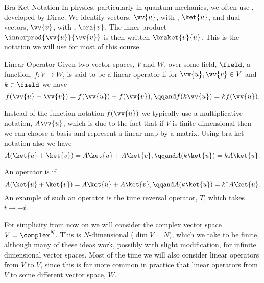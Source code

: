 \begin{ntn}{Bra-Ket Notation}{}
    In physics, particularly in quantum mechanics, we often use , developed by Dirac.
    We identify vectors, \(\vv{u}\), with , \(\ket{u}\), and dual vectors, \(\vv{v}\), with , \(\bra{v}\).
    The inner product \(\innerprod{\vv{u}}{\vv{v}}\) is then written \(\braket{v}{u}\).
    This is the notation we will use for most of this course.
\end{ntn}

\begin{dfn}{Linear Operator}{}
    Given two vector spaces, \(V\) and \(W\), over some field, \(\field\), a function, \(f \colon V \to W\), is said to be a linear operator if for \(\vv{u}, \vv{v} \in V\) and \(k \in \field\) we have
    \begin{equation}
        f(\vv{u} + \vv{v}) = f(\vv{u}) + f(\vv{v}), \qqand f(k\vv{u}) = kf(\vv{u}).
    \end{equation}
    
    Instead of the function notation \(f(\vv{u})\) we typically use a multiplicative notation, \(A\vv{u}\), which is due to the fact that if \(V\) is finite dimensional then we can choose a basis and represent a linear map by a matrix.
    Using bra-ket notation also we have
    \begin{equation}
        A(\ket{u} + \ket{v}) = A\ket{u} + A\ket{v}, \qqand A(k\ket{u}) = kA\ket{u}.
    \end{equation}
    
    An operator is  if
    \begin{equation}
        A(\ket{u} + \ket{v}) = A\ket{u} + A\ket{v}, \qqand A(k\ket{u}) = k^*A\ket{u}.
    \end{equation}
    An example of such an operator is the time reversal operator, \(T\), which takes \(t \to -t\).
\end{dfn}

For simplicity from now on we will consider the complex vector space \(V = \complex^N\).
This is \(N\)-dimensional (\(\dim V = N\)), which we take to be finite, although many of these ideas work, possibly with slight modification, for infinite dimensional vector spaces.
Most of the time we will also consider linear operators from \(V\) to \(V\), since this is far more common in practice that linear operators from \(V\) to some different vector space, \(W\).

